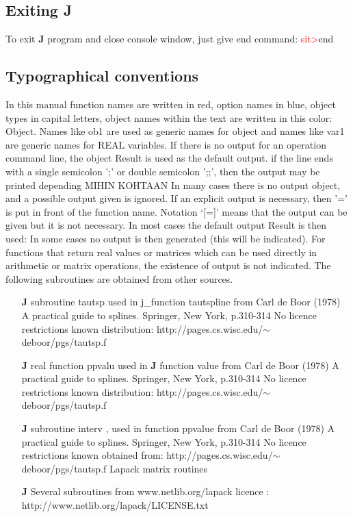 \subsection{Exiting \textbf{J}}
\label{exit}
To exit \textbf{J} program and close console window, just give end command:
\textcolor{Red}{sit>}end
\subsection{Typographical conventions}
\label{typo}
In this manual function names are written in red, option names in blue, object types in
capital letters, object names within the text are written in this color: {Object}.
Names like {ob1} are used as generic names for object and names like  {var1}
are generic names for REAL variables.
If there is no output for an operation command line,
the object Result is used as the default output.
if the line ends with a single semicolon ';' or double semicolon ';;', then
the output may be printed depending MIHIN KOHTAAN
In many cases there is no output object, and a possible
output given is ignored. If an explicit output is necessary, then '=' is
put in front of the function name. Notation ‘[=]’ means that the output can be given but
it is not necessary. In most cases the default output Result is then used:
In some cases no output is then generated (this will be indicated).
For functions that return real values or matrices which can be
used directly in arithmetic or matrix operations,
the existence of output is not indicated.
\label{license}
The following subroutines are obtained from other sources.
\begin{itemize}
\item[\textbf{J}]  subroutine tautsp used in j\_function tautspline
from Carl de Boor (1978) A practical guide to splines. Springer, New York, p.310-314
No licence restrictions known
distribution:  http://pages.cs.wisc.edu/$\sim$deboor/pgs/tautsp.f
\item[\textbf{J}]  real function ppvalu used in \textbf{J} function value
from Carl de Boor (1978) A practical guide to splines. Springer, New York, p.310-314
No licence restrictions known
distribution: http://pages.cs.wisc.edu/$\sim$deboor/pgs/tautsp.f
\item[\textbf{J}] subroutine interv , used in function ppvalue
from Carl de Boor (1978) A practical guide to splines. Springer, New York, p.310-314
No licence restrictions known
obtained from: http://pages.cs.wisc.edu/$\sim$deboor/pgs/tautsp.f
Lapack matrix routines
\item[\textbf{J}] Several subroutines from www.netlib.org/lapack
licence : http://www.netlib.org/lapack/LICENSE.txt
\end{itemize}
